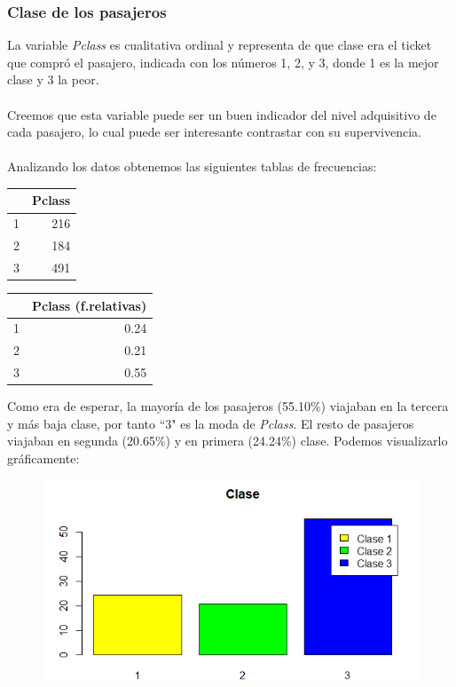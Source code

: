 \documentclass{article}
\begin{document}
\newpage
\subsubsection{Clase de los pasajeros}
La variable \textit{Pclass} es cualitativa ordinal y representa de que clase era el ticket que compró el pasajero, indicada con los números 1, 2, y 3, donde 1 es la mejor clase y 3 la peor.\\\\
Creemos que esta variable puede ser un buen indicador del nivel adquisitivo de cada pasajero, lo cual puede ser interesante contrastar con su supervivencia.\\\\
Analizando los datos obtenemos las siguientes tablas de frecuencias:

\begin{table}[htbp]
    \centering
    \begin{minipage}{.5\textwidth}
        \centering
        \begin{tabular}{rr}
          \hline
         & Pclass \\ 
          \hline
        1 & 216 \\ 
          2 & 184 \\ 
          3 & 491 \\ 
           \hline
        \end{tabular}
    \end{minipage}%
    \begin{minipage}{.5\textwidth}
        \centering
        \begin{tabular}{rr}
          \hline
         & Pclass (f.relativas) \\ 
          \hline
        1 & 0.24 \\ 
          2 & 0.21 \\ 
          3 & 0.55 \\ 
           \hline
        \end{tabular}
    \end{minipage}
\end{table}

\noindent Como era de esperar, la mayoría de los pasajeros (55.10\%) viajaban en la tercera y más baja clase, por tanto ``3" es la moda de \textit{Pclass}. El resto de pasajeros viajaban en segunda (20.65\%) y en primera (24.24\%) clase. Podemos visualizarlo gráficamente:

\begin{figure}[!h]
    \centering
    \includegraphics[width=0.7\linewidth]{content/bar_class.png}
\end{figure}
\end{document}
